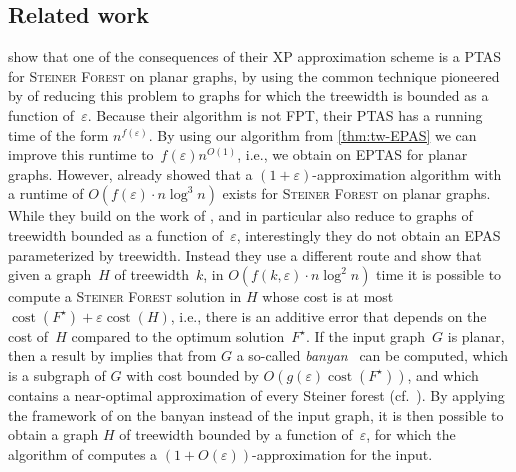 \documentclass[a4paper]{article}
\let\oldcitet\citet
\renewcommand{\citet}[1]{\mbox{\oldcitet{#1}}}
\theoremstyle{plain}
\newcommand{\eps}{{\varepsilon}}
\newcommand{\pname}[1]{\textsc{#1}}
\DeclareMathOperator{\cost}{cost}
\newcommand{\SF}{\pname{Steiner Forest}\xspace}
\begin{document}
%
%
%
%
%
%
%
%
%
%
%
%
%
%
%
%
%
%
%
%
%
%
%
%
%
%
%
%
%
%


%
%





\subsection{Related work}
\label{sec:related}

\citet{bateni2011approximation} show that one of the consequences of their XP
approximation scheme is a PTAS for \SF on planar graphs, by using the common
technique pioneered by \citet{baker1994approximation} of reducing this problem
to graphs for which the treewidth is bounded as a function of~$\eps$.  Because
their algorithm is not FPT, their PTAS has a running time of the form
$n^{f(\eps)}$. By using our algorithm from \autoref{thm:tw-EPAS} we can improve
this runtime to~$f(\eps)n^{O(1)}$, i.e., we obtain on EPTAS for planar graphs.
However, \citet{eisenstat2012efficient} already showed that a
$(1+\eps)$-approximation algorithm with a runtime of $O(f(\eps)\cdot n\log^3
n)$ exists for \SF on planar graphs. While they build on the work of
\citet{bateni2011approximation}, and in particular also reduce to graphs of
treewidth bounded as a function of~$\eps$, interestingly they do not obtain an
EPAS parameterized by treewidth.  Instead they use a different route and show
that given a graph~$H$ of treewidth~$k$, in $O(f(k,\eps)\cdot n\log^2 n)$ time
it is possible to compute a \SF solution in $H$ whose cost is at most
$\cost(F^\star)+\eps\cost(H)$, i.e., there is an additive error that depends on
the cost of~$H$ compared to the optimum solution~$F^\star$. If the input
graph~$G$ is planar, then a result by \citet{borradaile2009n} implies that from
$G$ a so-called \emph{banyan}~\cite{rao1998approximating, bartal2021near} can
be computed, which is a subgraph of $G$ with cost bounded by
$O(g(\eps)\cost(F^\star))$, and which contains a near-optimal approximation of
every Steiner forest (cf.~\cite[Lemma~2.1]{eisenstat2012efficient}). By
applying the framework of \citet{bateni2011approximation} on the banyan instead
of the input graph, it is then possible to obtain a graph $H$ of treewidth
bounded by a function of~$\eps$, for which the algorithm of
\citet{eisenstat2012efficient} computes a $(1+O(\eps))$-approximation for the
input. 
\end{document}

